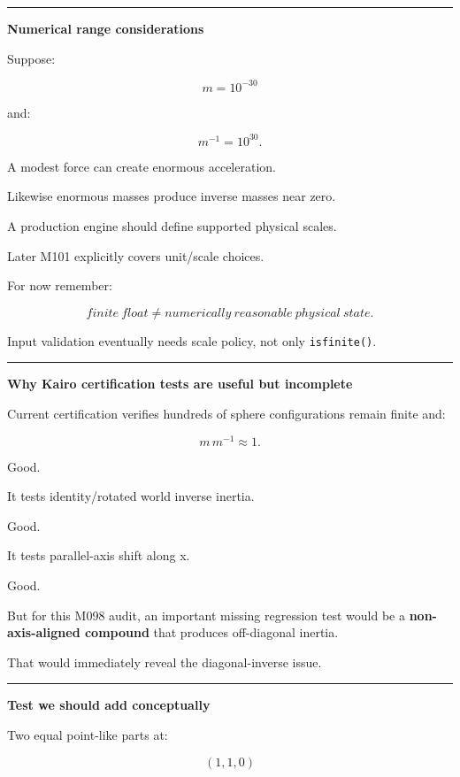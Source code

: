 \begin{center}\rule{0.5\linewidth}{0.5pt}\end{center}

\textbf{Numerical range considerations}

Suppose:

\[
m=10^{-30}
\]

and:

\[
m^{-1}=10^{30}.
\]

A modest force can create enormous acceleration.

Likewise enormous masses produce inverse masses near zero.

A production engine should define supported physical scales.

Later M101 explicitly covers unit/scale choices.

For now remember:

\[
\boxed{
finite\ float
\neq
numerically\ reasonable\ physical\ state.
}
\]

Input validation eventually needs scale policy, not only \texttt{isfinite()}.

\begin{center}\rule{0.5\linewidth}{0.5pt}\end{center}

\textbf{Why Kairo certification tests are useful but incomplete}

Current certification verifies hundreds of sphere configurations remain finite and:

\[
m\,m^{-1}\approx1.
\]

Good.

It tests identity/rotated world inverse inertia.

Good.

It tests parallel-axis shift along x.

Good.

But for this M098 audit, an important missing regression test would be a \textbf{non-axis-aligned compound} that produces off-diagonal inertia.

That would immediately reveal the diagonal-inverse issue.

\begin{center}\rule{0.5\linewidth}{0.5pt}\end{center}

\textbf{Test we should add conceptually}

Two equal point-like parts at:

\[
(1,1,0)
\]

